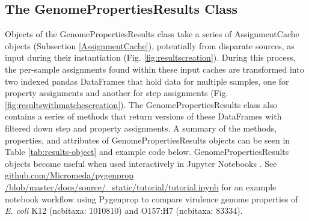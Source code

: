 \subsection{The GenomePropertiesResults Class}

Objects of the GenomePropertiesResults class take a series of AssignmentCache 
objects (Subsection \ref{AssignmentCache}), potentially from disparate sources, 
as input during their instantiation (Fig. \ref{fig:resultscreation}). During 
this process, the per-sample assignments found within these input caches are 
transformed into two indexed pandas DataFrames \cite{mckinney2010data} that hold 
data for multiple samples, one for property assignments and another for step 
assignments (Fig. \ref{fig:resultswithmatchescreation}). The 
GenomePropertiesResults class also contains a series of methods that return 
versions of these DataFrames with filtered down step and property assignments. A 
summary of the methods, properties, and attributes of GenomePropertiesResults 
objects can be seen in Table \ref{tab:results-object} and example code below. 
GenomePropertiesResults objects become useful when used interactively in Jupyter 
Notebooks \cite{kluyver2016jupyter}. See 
\href{http://github.com/Micromeda/pygenprop/blob/master/docs/source/_static/tutorial/tutorial.ipynb}{github.com/Micromeda/pygenprop 
/blob/master/docs/source/\_static/tutorial/tutorial.ipynb} for an example 
notebook workflow using Pygenprop to compare virulence genome properties of 
\textit{E. coli} K12 (\gls{ncbitaxa}: 1010810) and O157:H7 (\gls{ncbitaxa}: 
83334).

